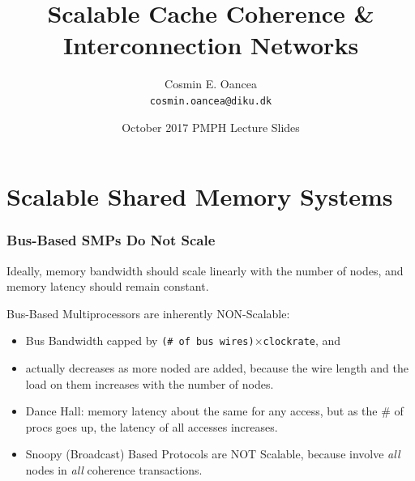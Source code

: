 \documentclass{beamer}
\title[Interconnect]{Scalable Cache Coherence \&\\Interconnection Networks}
\author[C.~Oancea]{Cosmin E. Oancea\\{\tt cosmin.oancea@diku.dk}}
\institute{Department of Computer Science (DIKU)\\University of Copenhagen}
\date[Oct 2017]{October 2017 PMPH Lecture Slides}
\renewcommand{\emph}[1]{\textcolor{structure}{#1}}
\newcommand{\emp}[1]{\textcolor{DikuRed}{ #1}}
\begin{document}
\titleslide




\begin{frame}[fragile]
	\tableofcontents
\end{frame}


\section{Scalable Shared Memory Systems}

\begin{frame}[fragile,t]
\frametitle{Bus-Based SMPs Do Not Scale}

\emph{Ideally, memory bandwidth should scale linearly with the number of nodes,
and memory latency should remain constant}.\bigskip

\alert{Bus-Based Multiprocessors are inherently NON-Scalable}:\medskip
\begin{itemize}
    \item \emp{Bus Bandwidth} capped by {\tt (\# of bus wires)$\times$clockrate}, and
    \item \emp{actually decreases as more noded are added}, 
            because the wire length and the load on them 
            increases with the number of nodes.\bigskip
    \item Dance Hall: memory latency about the same for any access,
            but as the \# of procs goes up, the latency of all
            accesses increases.\bigskip\pause
    \item \emp{Snoopy (Broadcast) Based Protocols are NOT Scalable},
            because involve {\em all} nodes in {\em all} coherence transactions. 
\end  {itemize}
\end{frame}
\end{document}
